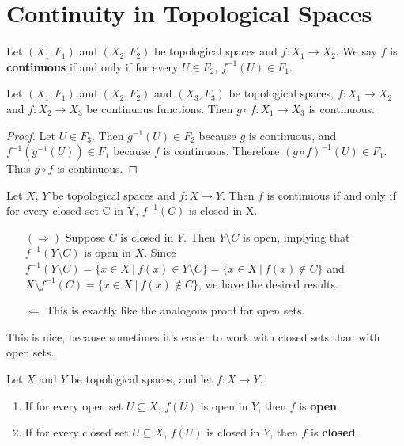 

\section{Continuity in Topological Spaces} 
\begin{definition}
	Let $(X_1,F_1)$ and $(X_2,F_2)$ be topological spaces and $f: X_1 \to X_2$. We say $f$ is {\bf continuous} if and only if for every $U \in F_2$, $f^{-1}(U)\in F_1$. 
\end{definition}
\begin{smallfact}
	Let $(X_1,F_1)$ and $(X_2,F_2)$ and $(X_3,F_3)$ be topological spaces, $f: X_1 \to X_2$ and $f: X_2 \to X_3$ be continuous functions. Then $g \circ f: X_1 \to X_3$ is continuous. 
\end{smallfact}
\begin{proof}
	Let $U \in F_3$. Then $g^{-1}(U) \in F_2$ because $g$ is continuous, and $f^{-1}(g^{-1}(U)) \in F_1$ because $f$ is continuous. Therefore $(g \circ f)^{-1}(U) \in F_1$. Thus $g\circ f$ is continuous. 
\end{proof}
\begin{theorem}
	Let $X$, $Y$ be topological spaces and $f: X \to Y$. Then $f$ is continuous if and only if for every closed set C in Y, $f^{-1}(C)$ is closed in X. 
\end{theorem}
\begin{itemize}
	\item [$(\Rightarrow)$] Suppose $C$ is closed in $Y$. Then $Y\setminus C$ is open, implying that $f^{-1}(Y\setminus C)$ is open in $X$. Since $f^{-1}(Y\setminus C)= \{ x \in X\ |\ f(x) \in Y\setminus C\} = \{ x \in X\ |\ f(x) \notin C \}$ and $X\setminus f^{-1}(C)= \{ x \in X\ |\ f(x) \notin C \}$, we have the desired results. 
	\item [$\Leftarrow$] This is exactly like the analogous proof for open sets. 
\end{itemize}

This is nice, because sometimes it's easier to work with closed sets than with open sets. 
\begin{definition}
	Let $X$ and $Y$ be topological spaces, and let $f:X\to Y$. 
	\begin{enumerate}
		\item If for every open set $U\subseteq X$, $f(U)$ is open in $Y$, then $f$ is {\bf open}. 
		\item If for every closed set $U\subseteq X$, $f(U)$ is closed in $Y$, then $f$ is {\bf closed}. 
	\end{enumerate}
\end{definition}

